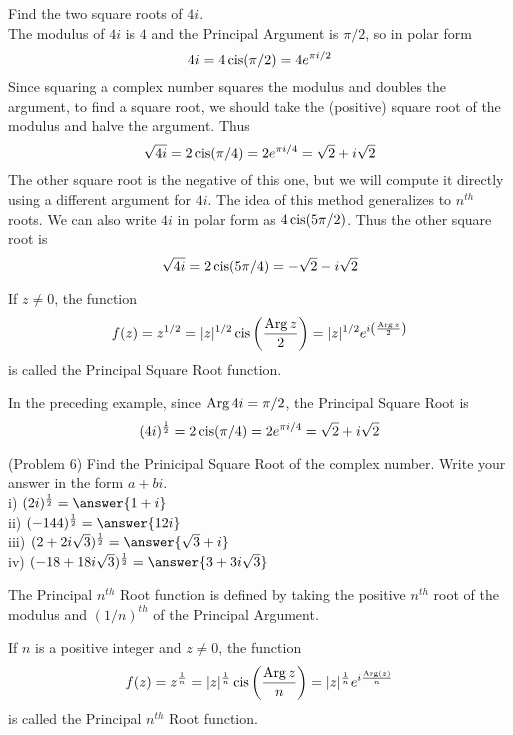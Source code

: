 \documentclass[handout]{ximera}
\begin{document}
\begin{example}[Example 6] 
Find the two square roots of $4i$. \\
The modulus of $4i$ is $4$ and the Principal Argument is $\pi/2$, so in polar form
\[
4i = 4\operatorname{cis}(\pi/2) = 4e^{\pi i/2}
\]
Since squaring a complex number squares the modulus and doubles the argument, 
to find a square root, we should take the (positive) square root of the modulus and halve the argument.
Thus
\[
\sqrt{4i} = 2\operatorname{cis}(\pi/4) = 2e^{\pi i/4} = \sqrt 2 + i\sqrt 2
\]
The other square root is the negative of this one, but we will compute it directly using a different argument for $4i$.
The idea of this method generalizes to $n^{th}$ roots.
We can also write $4i$ in polar form as $4\operatorname{cis}(5\pi/2)$.  Thus the other square root is
\[
\sqrt{4i} = 2\operatorname{cis}(5\pi/4) = -\sqrt 2 - i\sqrt 2
\]

\end{example}


\begin{definition}
If $z \neq 0$, the function
\[
f(z) = z^{1/2} =  |z|^{1/2} \operatorname{cis}\left(\frac{\operatorname{Arg} z}{2}\right) = |z|^{1/2} e^{i\left(\frac{\operatorname{Arg} z}{2}\right)}
\]
is called the Principal Square Root function.
\end{definition}


\begin{remark} In the preceding example, since $\operatorname{Arg} 4i = \pi/2$, the Principal Square Root is
\[
(4i)^{\frac12} = 2\operatorname{cis}(\pi/4) = 2e^{\pi i /4} = \sqrt 2 + i\sqrt 2
\] 
\end{remark}


\begin{problem}(Problem 6)
Find the Prinicipal Square Root of the complex number. Write your answer in the form $a + bi$.\\
i) $(2i)^{\frac12} = \answer{1+i}$\\
ii) $(-144)^{\frac12} = \answer{12i}$\\
iii) $(2 + 2i\sqrt 3)^{\frac12} = \answer{\sqrt 3 + i}$\\
iv) $(-18+ 18i\sqrt 3)^{\frac12} = \answer{3 + 3i\sqrt 3}$\\
\end{problem}


The Principal $n^{th}$ Root function is defined by taking the positive $n^{th}$ root of the modulus and 
$(1/n)^{th}$ of the Principal Argument.

\begin{definition}
If $n$ is a positive integer and $z \neq 0$, the function
\[
f(z) = z^{\frac1n} =  |z|^{\frac1n} \operatorname{cis}\left(\frac{\operatorname{Arg} z}{n}\right) = |z|^{\frac1n} e^{i\frac{\operatorname{Arg}(z)}{n}}
\]
is called the Principal $n^{th}$ Root function.
\end{definition}
\end{document}
